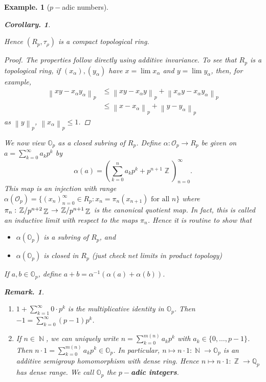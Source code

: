 \documentclass[11pt, a4paper]{memoir}
\DeclareMathOperator{\N}{{\mathbb{N}}}
\DeclareMathOperator{\Z}{{\mathbb{Z}}}
\newcommand{\norm}[1]{\ensuremath{\left\lVert#1\right\rVert}}
\theoremstyle{change}
\newtheorem{corollary}[theorem]{Corollary.}
\theoremstyle{plain}
\theoremstyle{nonumberplain}
\newtheorem{example}{Example.}
\newtheorem{remark}{Remark.}
\newtheorem{proof}{Proof}
\newcommand{\quot}[2]{\mathchoice{\left.\raisebox{0.14em}{$#1$}\middle/\raisebox{-0.14em}{$#2$}\right.}
                                 {\left.\raisebox{0.08em}{$#1$}\middle/\raisebox{-0.08em}{$#2$}\right.}
                                 {\left.\raisebox{0.03em}{$#1$}\middle/\raisebox{-0.03em}{$#2$}\right.}
                                 {\left.\raisebox{0em}{$#1$}\middle/\raisebox{0em}{$#2$}\right.}}
\newcommand{\defn}[1]{{\boldmath\bfseries #1}}
\numberwithin{equation}{section}
\begin{document}
\begin{example}[$p-$adic numbers]
\begin{corollary}
\begin{itemize}[nl]
        \end{itemize}
        Hence $(R_p,\tau_\rho)$ is a compact topological ring.
    \end{corollary}
    \begin{proof}
        The properties follow directly using additive invariance.
        To see that $R_p$ is a topological ring, if $(x_\alpha),(y_\alpha)$ have $x=\lim x_\alpha$ and $y=\lim y_\alpha$, then, for example,
        \begin{align*}
            \norm{xy-x_\alpha y_\alpha}_p&\leq\norm{xy-x_\alpha y}_p+\norm{x_\alpha y-x_\alpha y_\alpha}_p\\
                                         &\leq\norm{x-x_\alpha}_p+\norm{y-y_\alpha}_p
        \end{align*}
        as $\norm{y}_p$, $\norm{x_\alpha}_p\leq 1$.
    \end{proof}
    We now view $\mathbb{O}_p$ as a closed subring of $R_p$.
    Define $\alpha:\mathcal{O}_p\to R_p$ be given on $a=\sum_{k=0}^\infty a_kp^k$ by
    \begin{equation*}
        \alpha(a) = \left(\sum_{k=0}^n a_kp^k+p^{n+1}\Z\right)_{n=0}^\infty.
    \end{equation*}
    This map is an injection with range $\alpha(\mathcal{O}_p)=\{(x_n)_{n=0}^\infty\in R_p:x_n=\pi_n(x_{n+1})\text{ for all }n\}$ where $\pi_n:\quot{\Z}{p^{n+2}\Z}\to\quot{\Z}{p^{n+1}\Z}$ is the canonical quotient map.
    In fact, this is called an inductive limit with respect to the maps $\pi_n$.
    Hence it is routine to show that
    \begin{itemize}[nl]
        \item $\alpha(\mathbb{O}_p)$ is a subring of $R_p$, and
        \item $\alpha(\mathbb{O}_p)$ is closed in $R_p$ (just check net limits in product topology)
    \end{itemize}
    If $a,b\in\mathbb{O}_p$, define $a+b=\alpha^{-1}(\alpha(a)+\alpha(b))$.
    \begin{remark}
        \begin{enumerate}[nl,r]
            \item $1+\sum_{k=1}^\infty 0\cdot p^k$ is the multiplicative identity in $\mathbb{O}_p$.
                Then $-1=\sum_{k=0}^\infty(p-1)p^k$.
            \item If $n\in\N$, we can uniquely write $n=\sum_{k=0}^{m(n)} a_kp^k$ with $a_k\in\{0,\ldots,p-1\}$.
                Then $n\cdot 1=\sum_{k=0}^{m(n)}a_kp^k\in\mathbb{O}_p$.
                In particular, $n\mapsto n\cdot 1:\N\to\mathbb{O}_p$ is an additive semigroup homomorphism with dense ring.
                Hence $n\mapsto n\cdot 1:\Z\to \mathbb{Q}_p$ has dense range.
                We call $\mathbb{O}_p$ the \defn{$p-$adic integers}.
        \end{enumerate}
    \end{remark}
\end{example}
\end{document}
